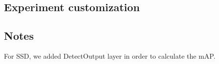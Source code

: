 \documentclass[sigplan]{acmart}
\begin{document}
\subsection{Experiment customization}

\subsection{Notes}
For SSD, we added DetectOutput layer in order to calculate the mAP.
\end{document}
